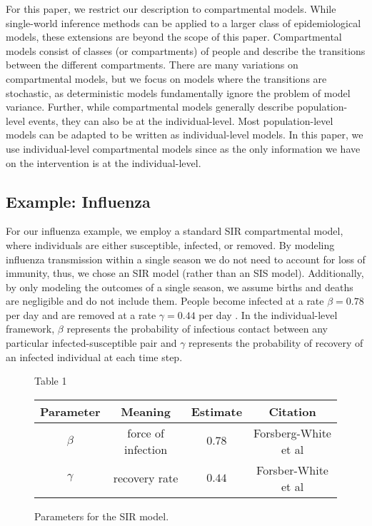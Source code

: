 \documentclass[openacc]{rsproca_new}%
\begin{document}
For this paper, we restrict our description to compartmental models. 
While single-world inference methods can be applied to a larger class of epidemiological models, these extensions are beyond the scope of this paper.
Compartmental models consist of classes (or compartments) of people and describe the transitions between the different compartments.
There are many variations on compartmental models, but we focus on models where the transitions are stochastic, as deterministic models fundamentally ignore the problem of model variance.
Further, while compartmental models generally describe population-level events, they can also be at the individual-level.
Most population-level models can be adapted to be written as individual-level models.
In this paper, we use individual-level compartmental models since as the only information we have on the intervention is at the individual-level.

\subsection{Example: Influenza}

For our influenza example, we employ a standard SIR compartmental model, where individuals are either susceptible, infected, or removed.
By modeling influenza transmission within a single season we do not need to account for loss of immunity, thus, we chose an SIR model (rather than an SIS model). 
Additionally, by only modeling the outcomes of a single season, we assume births and deaths are negligible and do not include them. %
People become infected at a rate $\beta = 0.78$ per day and are removed at a rate $\gamma = 0.44$ per day \cite{forsberg-white-et-al:2009}.
In the individual-level framework, $\beta$ represents the probability of infectious contact between any particular infected-susceptible pair and $\gamma$ represents the probability of recovery of an infected individual at each time step. %

\begin{figure}{Table 1}
\begin{tabular}{|c|c|c|c|}
\hline
\textbf{Parameter} & \textbf{Meaning} & \textbf{Estimate} & \textbf{Citation}\\
\hline
$\beta$ & force of infection & $0.78$ & Forsberg-White et al\\
$\gamma$ & recovery rate & $0.44$ & Forsber-White et al\\
\hline
\end{tabular}
\caption{Parameters for the SIR model.}
\end{figure}
\end{document}
